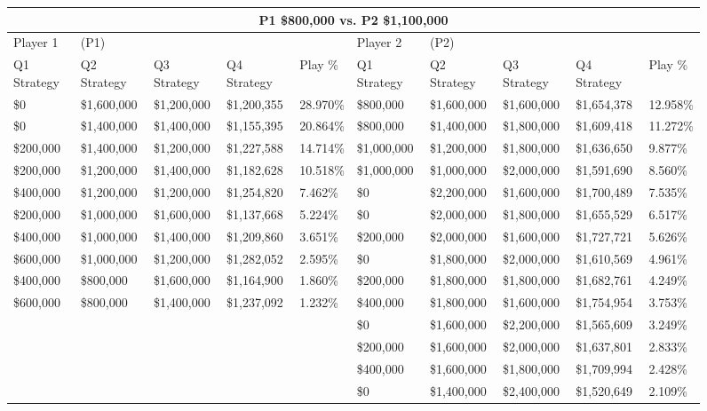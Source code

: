 \documentclass[11pt]{article}
\begin{document}
\begin{figure}
\tiny
\begin{tabular}{ |p{1.0cm}p{1.0cm}p{1.0cm}p{2.0cm}|p{1.0cm}||p{1.0cm}p{1.0cm}p{1.0cm}p{2.0cm}|p{1.0cm}|}
\hline
\multicolumn{10}{|c|}{P1 \$800,000 vs. P2 \$1,100,000} \\
\hline
Player 1 & (P1) & & & & Player 2 & (P2) & & & \\
\hline
Q1 Strategy & Q2 Strategy & Q3 Strategy & Q4 Strategy  &  Play \% & Q1 Strategy & Q2 Strategy & Q3 Strategy & Q4 Strategy  &  Play \%\\
\hline
\$0 & \$1,600,000 & \$1,200,000 & \$1,200,355 & 28.970\% & \$800,000 & \$1,600,000 & \$1,600,000 & \$1,654,378 & 12.958\% \\
\$0 & \$1,400,000 & \$1,400,000 & \$1,155,395 & 20.864\% & \$800,000 & \$1,400,000 & \$1,800,000 & \$1,609,418 & 11.272\% \\
\$200,000 & \$1,400,000 & \$1,200,000 & \$1,227,588 & 14.714\% & \$1,000,000 & \$1,200,000 & \$1,800,000 & \$1,636,650 & 9.877\% \\
\$200,000 & \$1,200,000 & \$1,400,000 & \$1,182,628 & 10.518\% & \$1,000,000 & \$1,000,000 & \$2,000,000 & \$1,591,690 & 8.560\% \\
\$400,000 & \$1,200,000 & \$1,200,000 & \$1,254,820 & 7.462\% & \$0 & \$2,200,000 & \$1,600,000 & \$1,700,489 & 7.535\% \\
\$200,000 & \$1,000,000 & \$1,600,000 & \$1,137,668 & 5.224\% & \$0 & \$2,000,000 & \$1,800,000 & \$1,655,529 & 6.517\% \\
\$400,000 & \$1,000,000 & \$1,400,000 & \$1,209,860 & 3.651\% & \$200,000 & \$2,000,000 & \$1,600,000 & \$1,727,721 & 5.626\% \\
\$600,000 & \$1,000,000 & \$1,200,000 & \$1,282,052 & 2.595\% & \$0 & \$1,800,000 & \$2,000,000 & \$1,610,569 & 4.961\% \\
\$400,000 & \$800,000 & \$1,600,000 & \$1,164,900 & 1.860\% & \$200,000 & \$1,800,000 & \$1,800,000 & \$1,682,761 & 4.249\% \\
\$600,000 & \$800,000 & \$1,400,000 & \$1,237,092 & 1.232\% & \$400,000 & \$1,800,000 & \$1,600,000 & \$1,754,954 & 3.753\% \\
&&&& & \$0 & \$1,600,000 & \$2,200,000 & \$1,565,609 & 3.249\% \\
&&&& & \$200,000 & \$1,600,000 & \$2,000,000 & \$1,637,801 & 2.833\% \\
&&&& & \$400,000 & \$1,600,000 & \$1,800,000 & \$1,709,994 & 2.428\% \\
&&&& & \$0 & \$1,400,000 & \$2,400,000 & \$1,520,649 & 2.109\% \\

\end{tabular}
\end{figure}
\end{document}
